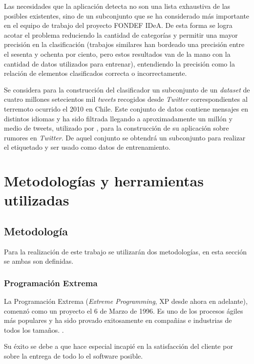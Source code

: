 Las necesidades que la aplicación detecta no son una lista exhaustiva de las posibles existentes, sino de un subconjunto que se ha considerado más importante en el equipo de trabajo del proyecto FONDEF IDeA. De esta forma se logra acotar el problema reduciendo la cantidad de categorías y permitir una mayor precisión en la clasificación (trabajos similares han bordeado una precisión entre el sesenta y ochenta por ciento, pero estos resultados van de la mano con la cantidad de datos utilizados para entrenar), entendiendo la precisión como la relación de elementos clasificados correcta o incorrectamente.

Se considera para la construcción del clasificador un subconjunto de un \textit{dataset} de cuatro millones setecientos mil \textit{tweets} recogidos desde \textit{Twitter} correspondientes al terremoto ocurrido el 2010 en Chile. Este conjunto de datos contiene mensajes en distintos idiomas y ha sido filtrada llegando a aproximadamente un millón y medio de tweets, utilizado por \cite{}, para la construcción de su aplicación sobre rumores en \textit{Twitter}. De aquel conjunto se obtendrá un subconjunto para realizar el etiquetado y ser usado como datos de entrenamiento. 

\section{Metodologías y herramientas utilizadas}
\label{intro:metodologia}

\subsection{Metodología}
\label{subsec:MetodologiaDetalle}

Para la realización de este trabajo se utilizarán dos metodologías, en esta sección se ambas son definidas.

\subsubsection*{Programación Extrema}
\label{subsubsec:XP}

La Programación Extrema (\textit{Extreme Programming}, XP desde ahora en adelante), comenzó como un proyecto el 6 de Marzo de 1996. Es uno de los procesos ágiles más populares y ha sido provado exitosamente en compañias e industrias de todos los tamaños. \cite{xP}.

Su éxito se debe a que hace especial incapié en la satisfacción del cliente por sobre la entrega de todo lo el software posible.

